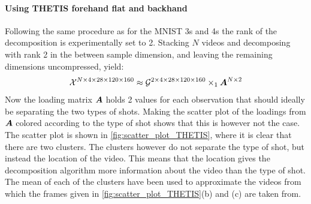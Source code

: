 \paragraph{Using THETIS forehand flat and backhand}
Following the same procedure as for the MNIST 3s and 4s the rank of the decomposition is experimentally set to 2. Stacking $N$ videos and decomposing with rank 2 in the between sample dimension, and leaving the remaining dimensions uncompressed, yield:
\begin{equation}
    \mathcal{X}^{N\times 4 \times 28 \times 120 \times 160} \approx \mathcal{G}^{2 \times 4 \times 28 \times 120 \times 160} \times_1 \boldsymbol{A}^{N\times 2}
\end{equation}
Now the loading matrix $\boldsymbol{A}$ holds 2 values for each observation that should ideally be separating the two types of shots. Making the scatter plot of the loadings from $\boldsymbol{A}$ colored according to the type of shot shows that this is however not the case. The scatter plot is shown in \autoref{fig:scatter_plot_THETIS}, where it is clear that there are two clusters. The clusters however do not separate the type of shot, but instead the location of the video. This means that the location gives the decomposition algorithm more information about the video than the type of shot. The mean of each of the clusters have been used to approximate the videos from which the frames given in \autoref{fig:scatter_plot_THETIS}(b) and (c) are taken from.
